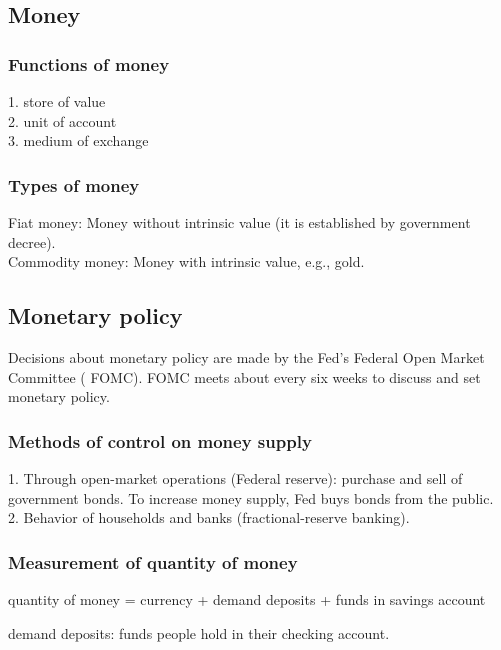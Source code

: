 \documentclass[12pt]{article}
\begin{document}
\subsection{Money}
\subsubsection{Functions of money}
1. store of value\\
2. unit of account\\
3. medium of exchange


\subsubsection{Types of money}
Fiat money: Money without intrinsic value (it is established by government decree).\\
Commodity money: Money with intrinsic value, e.g., gold.



\subsection{Monetary policy}

Decisions about monetary policy are made by the Fed's Federal Open Market Committee (
FOMC). FOMC meets about every six weeks to discuss and set monetary policy.


\subsubsection{Methods of control on money supply}

1. Through open-market operations (Federal reserve): purchase and sell of government 
bonds. To increase money supply, Fed buys bonds from the public.\\
2. Behavior of households and banks (fractional-reserve banking).



\subsubsection{Measurement of quantity of money}
quantity of money = currency + demand deposits + funds in savings account

demand deposits: funds people hold in their checking account.

\begin{figure}[H]
\end{figure}
\end{document}
